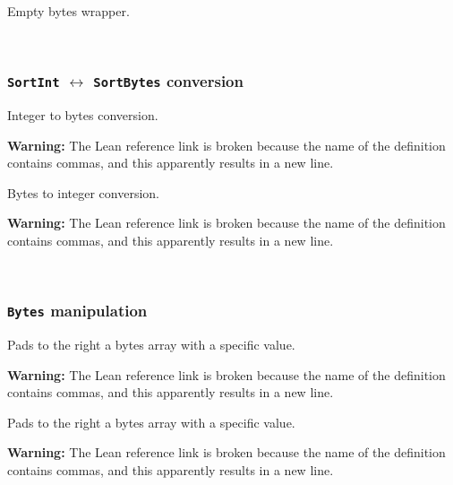 \begin{definition}[.Bytes]\label{def:.Bytes}\leanok{}
  Empty bytes wrapper.
\end{definition}

\\
\subsubsection{\texttt{SortInt} $\leftrightarrow$ \texttt{SortBytes} conversion}

\begin{definition}
\label{def:Int2Bytes}
\leanok{}
Integer to bytes conversion.

\textbf{Warning:} The Lean reference link is broken because the name of the
definition contains commas, and this apparently results in a new line.
\end{definition}

\begin{definition}\label{def:Bytes2Int}
\leanok{}
Bytes to integer conversion.

\textbf{Warning:} The Lean reference link is broken because the name of the
definition contains commas, and this apparently results in a new line.
\end{definition}

\\
\subsubsection{\texttt{Bytes} manipulation}

\begin{definition}[padRightBytes]\label{def:padRightBytes}
\leanok{}
Pads to the right a bytes array with a specific value.

\textbf{Warning:} The Lean reference link is broken because the name of the
definition contains commas, and this apparently results in a new line.
\end{definition}

\begin{definition}[padLeftBytes]\label{def:padLeftBytes}
\leanok{}
Pads to the right a bytes array with a specific value.

\textbf{Warning:} The Lean reference link is broken because the name of the
definition contains commas, and this apparently results in a new line.
\end{definition}

